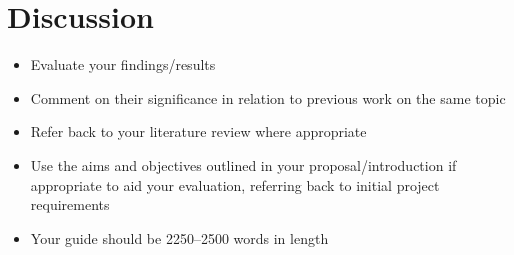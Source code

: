 \section{Discussion}
\begin{itemize}
\item Evaluate your findings/results
\item Comment on their significance in relation to previous work on the same topic
\item Refer back to your literature review where appropriate
\item Use the aims and objectives outlined in your proposal/introduction if appropriate to aid your evaluation, referring back to initial project requirements
\item Your guide should be 2250–2500 words in length
\end{itemize}